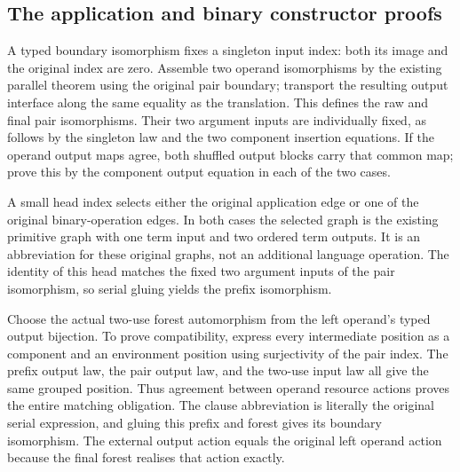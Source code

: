 \subsection{The application and binary constructor proofs}

A typed boundary isomorphism fixes a singleton input index: both its image
and the original index are zero. Assemble two operand isomorphisms by the existing
parallel theorem using the original pair boundary; transport the resulting
output interface along the same equality as the translation. This defines the
raw and final pair isomorphisms. Their two argument inputs are individually fixed,
as follows by the singleton law and the two component insertion equations.
If the operand output maps agree, both shuffled output blocks carry that common
map; prove this by the component output equation in each of the two cases.


A small head index selects either the original application edge or one
of the original binary-operation edges. In both cases the selected graph is the
existing primitive graph with one term input and two ordered term outputs. It
is an abbreviation for these original graphs, not an additional language
operation. The identity of this head matches the fixed two argument inputs of
the pair isomorphism, so serial gluing yields the prefix isomorphism.


Choose the actual two-use forest automorphism from the left operand's
typed output bijection. To prove compatibility, express every intermediate
position as a component and an environment position using surjectivity of the
pair index. The prefix output law, the pair output law, and the two-use input
law all give the same grouped position. Thus agreement between operand resource
actions proves the entire matching obligation. The clause abbreviation is
literally the original serial expression, and gluing this prefix and forest
gives its boundary isomorphism. The external output action equals the original
left operand action because the final forest realises that action exactly.

